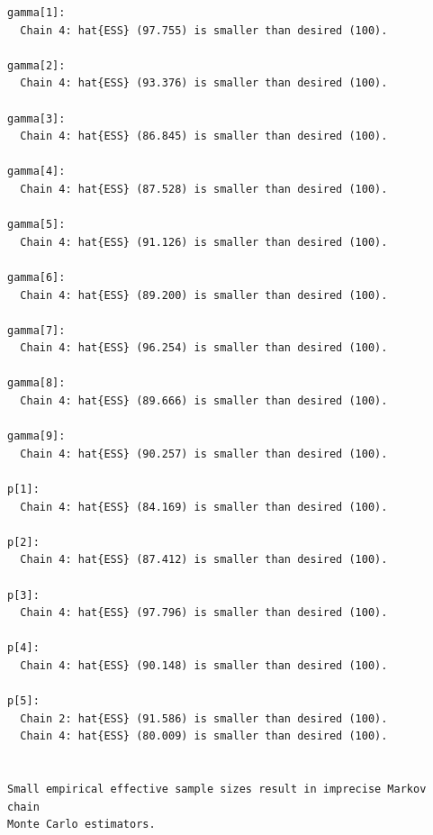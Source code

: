 \documentclass[
  letterpaper,
  DIV=11,
  numbers=noendperiod]{scrartcl}
\newenvironment{Shaded}{\begin{snugshade}}{\end{snugshade}}
\newcommand{\AttributeTok}[1]{\textcolor[rgb]{0.40,0.45,0.13}{#1}}
\newcommand{\ConstantTok}[1]{\textcolor[rgb]{0.56,0.35,0.01}{#1}}
\newcommand{\FunctionTok}[1]{\textcolor[rgb]{0.28,0.35,0.67}{#1}}
\newcommand{\NormalTok}[1]{\textcolor[rgb]{0.00,0.23,0.31}{#1}}
\newcommand{\OtherTok}[1]{\textcolor[rgb]{0.00,0.23,0.31}{#1}}
\newcommand{\SpecialCharTok}[1]{\textcolor[rgb]{0.37,0.37,0.37}{#1}}
\newcommand{\StringTok}[1]{\textcolor[rgb]{0.13,0.47,0.30}{#1}}
\begin{document}
\begin{Shaded}
\end{Shaded}

\begin{verbatim}
gamma[1]:
  Chain 4: hat{ESS} (97.755) is smaller than desired (100).

gamma[2]:
  Chain 4: hat{ESS} (93.376) is smaller than desired (100).

gamma[3]:
  Chain 4: hat{ESS} (86.845) is smaller than desired (100).

gamma[4]:
  Chain 4: hat{ESS} (87.528) is smaller than desired (100).

gamma[5]:
  Chain 4: hat{ESS} (91.126) is smaller than desired (100).

gamma[6]:
  Chain 4: hat{ESS} (89.200) is smaller than desired (100).

gamma[7]:
  Chain 4: hat{ESS} (96.254) is smaller than desired (100).

gamma[8]:
  Chain 4: hat{ESS} (89.666) is smaller than desired (100).

gamma[9]:
  Chain 4: hat{ESS} (90.257) is smaller than desired (100).

p[1]:
  Chain 4: hat{ESS} (84.169) is smaller than desired (100).

p[2]:
  Chain 4: hat{ESS} (87.412) is smaller than desired (100).

p[3]:
  Chain 4: hat{ESS} (97.796) is smaller than desired (100).

p[4]:
  Chain 4: hat{ESS} (90.148) is smaller than desired (100).

p[5]:
  Chain 2: hat{ESS} (91.586) is smaller than desired (100).
  Chain 4: hat{ESS} (80.009) is smaller than desired (100).


Small empirical effective sample sizes result in imprecise Markov chain
Monte Carlo estimators.
\end{verbatim}
\end{document}

